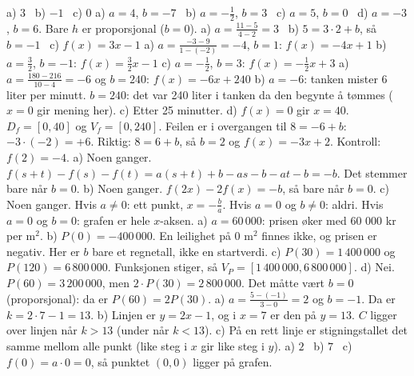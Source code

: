  a) $3$ \ b) $-1$ \ c) $0$
 a) $a = 4$, $b = -7$ \ b) $a = -\frac{1}{2}$, $b = 3$ \ c) $a = 5$, $b = 0$ \ d) $a = -3$, $b = 6$.
Bare $h$ er proporsjonal ($b = 0$).
 a) $a = \frac{11 - 5}{4 - 2} = 3$ \ b) $5 = 3 \cdot 2 + b$, så $b = -1$ \ c) $f(x) = 3x - 1$
 a) $a = \frac{-3 - 9}{1 - (-2)} = -4$, $b = 1$: $f(x) = -4x + 1$
b) $a = \frac{3}{2}$, $b = -1$: $f(x) = \frac{3}{2}x - 1$
c) $a = -\frac{1}{2}$, $b = 3$: $f(x) = -\frac{1}{2}x + 3$
 a) $a = \frac{180 - 216}{10 - 4} = -6$ og $b = 240$: $f(x) = -6x + 240$
b) $a = -6$: tanken mister 6 liter per minutt. $b = 240$: det var 240 liter i tanken da den begynte å tømmes ($x = 0$ gir mening her).
c) Etter 25 minutter. d) $f(x) = 0$ gir $x = 40$. $D_f = [0, 40]$ og $V_f = [0, 240]$.
 Feilen er i overgangen til $8 = -6 + b$: $-3 \cdot (-2) = +6$. Riktig: $8 = 6 + b$, så $b = 2$ og $f(x) = -3x + 2$. Kontroll: $f(2) = -4$.
 a) Noen ganger. $f(s+t) - f(s) - f(t) = a(s+t) + b - as - b - at - b = -b$. Det stemmer bare når $b = 0$.
b) Noen ganger. $f(2x) - 2f(x) = -b$, så bare når $b = 0$.
c) Noen ganger. Hvis $a \neq 0$: ett punkt, $x = -\frac{b}{a}$. Hvis $a = 0$ og $b \neq 0$: aldri. Hvis $a = 0$ og $b = 0$: grafen er hele $x$-aksen.
 a) $a = 60\,000$: prisen øker med 60 000 kr per m$^2$.
b) $P(0) = -400\,000$. En leilighet på 0 m$^2$ finnes ikke, og prisen er negativ. Her er $b$ bare et regnetall, ikke en startverdi.
c) $P(30) = 1\,400\,000$ og $P(120) = 6\,800\,000$. Funksjonen stiger, så $V_P = [1\,400\,000, 6\,800\,000]$.
d) Nei. $P(60) = 3\,200\,000$, men $2 \cdot P(30) = 2\,800\,000$. Det måtte vært $b = 0$ (proporsjonal): da er $P(60) = 2P(30)$.
 a) $a = \frac{5 - (-1)}{3 - 0} = 2$ og $b = -1$. Da er $k = 2 \cdot 7 - 1 = 13$.
b) Linjen er $y = 2x - 1$, og i $x = 7$ er den på $y = 13$. $C$ ligger over linjen når $k > 13$ (under når $k < 13$).
c) På en rett linje er stigningstallet det samme mellom alle punkt (like steg i $x$ gir like steg i $y$).
 a) $2$ \ b) $7$ \ c) $f(0) = a \cdot 0 = 0$, så punktet $(0, 0)$ ligger på grafen.

